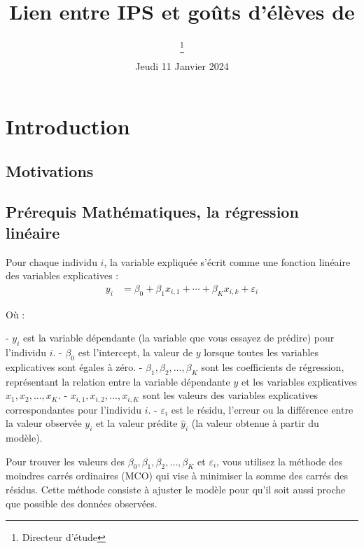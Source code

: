 \documentclass[a4paper, 11pt]{article}
\begin{document}
\title{Lien entre IPS et goûts d'élèves de}
\author{
   \and
   \and
    \thanks{Directeur d'étude}
} 
\date{Jeudi 11 Janvier 2024} 

\maketitle

\tableofcontents

\newpage

\section{Introduction}
\subsection{Motivations}

\subsection{Prérequis Mathématiques, la régression linéaire}

Pour chaque individu \(i\), la variable expliquée s'écrit comme une fonction linéaire des variables explicatives :
\begin{align}
y_i &= \beta_0 + \beta_1x_{i,1} + \cdots + \beta_Kx_{i,k} + \varepsilon_i
\end{align}

Où :

- \(y_i\) est la variable dépendante (la variable que vous essayez de prédire) pour l'individu \(i\).
- \(\beta_0\) est l'intercept, la valeur de \(y\) lorsque toutes les variables explicatives sont égales à zéro.
- \(\beta_1, \beta_2, \ldots, \beta_K\) sont les coefficients de régression, représentant la relation entre la variable dépendante \(y\) et les variables explicatives \(x_1, x_2, \ldots, x_K\).
- \(x_{i,1}, x_{i,2}, \ldots, x_{i,K}\) sont les valeurs des variables explicatives correspondantes pour l'individu \(i\).
- \(\varepsilon_i\) est le résidu, l'erreur ou la différence entre la valeur observée \(y_i\) et la valeur prédite \(\hat{y}_i\) (la valeur obtenue à partir du modèle).

Pour trouver les valeurs des \(\beta_0, \beta_1, \beta_2, \ldots, \beta_K\) et \(\varepsilon_i\), vous utilisez la méthode des moindres carrés ordinaires (MCO) qui vise à minimiser la somme des carrés des résidus. Cette méthode consiste à ajuster le modèle pour qu'il soit aussi proche que possible des données observées.
\end{document}
